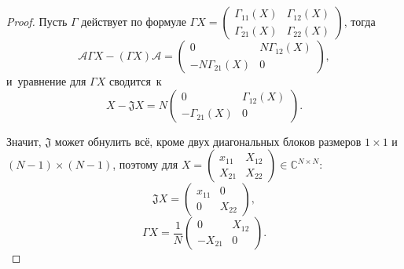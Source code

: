 \begin{proof}
Пусть \( \Gamma \) действует по формуле
\( \Gamma X = \begin{pmatrix} \Gamma_{11}(X) & \Gamma_{12}(X) \\
                              \Gamma_{21}(X) & \Gamma_{22}(X)
                              \end{pmatrix} \), тогда
\[
    \mathcal{A} \Gamma X - (\Gamma X)\mathcal{A} = 
    \begin{pmatrix} 0 & N\Gamma_{12}(X) \\
        - N\Gamma_{21}(X) & 0
        \end{pmatrix}, \]
и~уравнение для \( \Gamma X \) сводится~к
\[
    X - \mathfrak{J} X =
    N \begin{pmatrix} 0 & \Gamma_{12}(X) \\
        - \Gamma_{21}(X) & 0
        \end{pmatrix}. \]

Значит, \( \mathfrak{J} \) может обнулить вс\"е,
    кроме двух диагональных блоков размеров \( 1\times 1 \)
    и \( (N-1)\times(N-1) \),
поэтому для \( X =
    \begin{pmatrix}
    x_{11} & X_{12} \\
    X_{21} & X_{22}
    \end{pmatrix} \in \mathbb{C}^{N{\times}N} \):
\[
    \mathfrak{J} X = \begin{pmatrix} x_{11} & 0 \\ 0 & X_{22} \end{pmatrix}, \]
\[
    \Gamma X = \frac{1}{N}\begin{pmatrix} 0 & X_{12} \\ -X_{21} & 0 \end{pmatrix}. \]
\end{proof}

